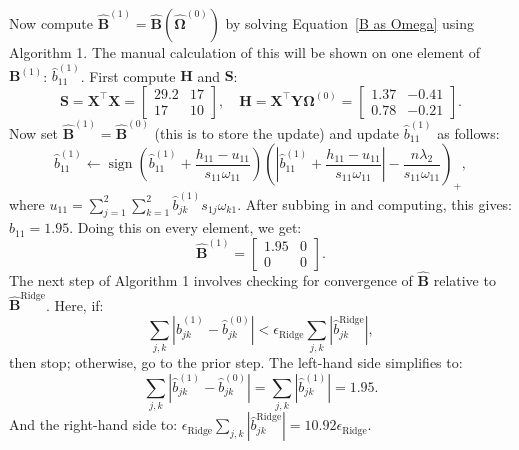\documentclass[11pt]{report} %
\begin{document}
\noindent Now compute \( \hat{\mathbf{B}}^{(1)} = \hat{\mathbf{B}}(\hat{\mathbf{\Omega}}^{(0)}) \) by solving Equation~\ref{B as Omega} using Algorithm 1. The manual calculation of this will be shown on one element of $\mathbf{B}^{(1)}$: $\hat{b}_{11}^{(1)}$. First compute $\mathbf{H}$ and $\mathbf{S}$: 
\[
\mathbf{S} = \mathbf{X}^\top \mathbf{X}=\begin{bmatrix}
29.2 & 17 \\
17 & 10
\end{bmatrix}, \quad  \mathbf{H} = \mathbf{X}^\top \mathbf{Y} \mathbf{\Omega}^{(0)}=\begin{bmatrix}
1.37 & -0.41 \\
0.78 & -0.21
\end{bmatrix}.
\]
\vspace{-0.4cm}
Now set $\mathbf{\hat{B}}^{(1)} = \mathbf{\hat{B}}^{(0)}$ (this is to store the update) and update \( \hat{b}^{(1)}_{11} \) as follows:
\[
\hat{b}^{(1)}_{11} \leftarrow \operatorname{sign} \left( \hat{b}^{(1)}_{11} + \frac{h_{11} - u_{11}}{s_{11} \omega_{11}} \right) 
\left( \left| \hat{b}^{(1)}_{11} + \frac{h_{11} - u_{11}}{s_{11} \omega_{11}} \right| - \frac{n \lambda_2}{s_{11} \omega_{11}} \right)_{+},
\]
where $u_{11} = \sum_{j=1}^{2} \sum_{k=1}^{2} \hat{b}^{(1)}_{jk} s_{1j} \omega_{k1}.$ After subbing in and computing, this gives:
$\hat{b}_{11} = 1.95.$ Doing this on every element, we get:
\[
\mathbf{\hat{B}}^{(1)} = \begin{bmatrix}
1.95 & 0\\
0 & 0
\end{bmatrix}.
\]
The next step of Algorithm 1 involves checking for convergence of $\mathbf{\hat{B}}$ relative to $\mathbf{\hat{B}}^{\text{Ridge}}$. Here, 
if:
\[\sum_{j,k} \left| \hat{b}^{(1)}_{jk} - \hat{b}^{(0)}_{jk} \right| < \epsilon_{\text{Ridge}} \sum_{j,k} \left| \hat{b}^{\text{Ridge}}_{jk} \right|,\]
then stop; otherwise, go to the prior step. The left-hand side simplifies to:
\[\sum_{j,k} \left| \hat{b}^{(1)}_{jk} - \hat{b}^{(0)}_{jk} \right| = \sum_{j,k}| \hat{b}^{(1)}_{jk}|=1.95.\]
And the right-hand side to:
\(
\epsilon_{\text{Ridge}} \sum_{j,k} \left| \hat{b}^{\text{Ridge}}_{jk} \right| = 10.92\epsilon_{\text{Ridge}}.
\)
\end{document}
